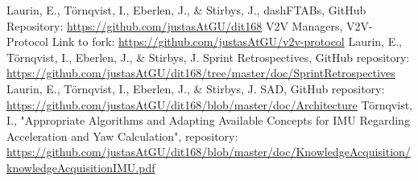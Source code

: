 \documentclass[12pt]{article}
\begin{document}
\def\refname{Supporting Project Documentation} %
\begin{thebibliography}{00}
	\makeatletter				%
	\addtocounter{\@listctr}{12}%
	\makeatother				%
	 Laurin, E., Törnqvist, I., Eberlen, J., \& Stirbys, J., dashFTABs, GitHub Repository: \url{https://github.com/justasAtGU/dit168}
	 V2V Managers, V2V-Protocol Link to fork: \url{https://github.com/justasAtGU/v2v-protocol}
	 Laurin, E., Törnqvist, I., Eberlen, J., \& Stirbys, J. Sprint Retrospectives, GitHub repository: \url{https://github.com/justasAtGU/dit168/tree/master/doc/SprintRetrospectives}
 Laurin, E., Törnqvist, I., Eberlen, J., \& Stirbys, J. SAD, GitHub repository: \url{https://github.com/justasAtGU/dit168/blob/master/doc/Architecture}
 Törnqvist, I., "Appropriate Algorithms and Adapting Available Concepts for IMU Regarding Acceleration and Yaw Calculation", repository: \url{https://github.com/justasAtGU/dit168/blob/master/doc/KnowledgeAcquisition/knowledgeAcquisitionIMU.pdf}
\end{thebibliography}
\pagebreak
\end{document}
